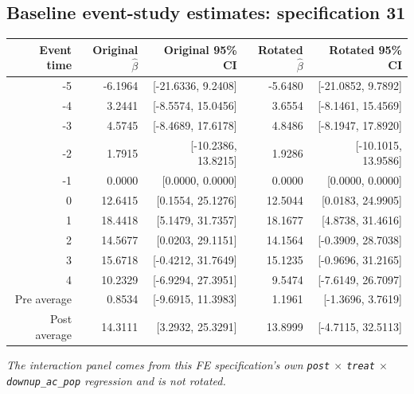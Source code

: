 \documentclass[10pt]{article}
\begin{document}
\subsection*{Baseline event-study estimates: specification 31}
\begin{center}
\scriptsize
\begin{tabular}{r rr rr}
\toprule
Event time & Original $\hat\beta$ & Original 95\% CI & Rotated $\hat\beta$ & Rotated 95\% CI \\
\midrule
-5 & -6.1964 & [-21.6336, 9.2408] & -5.6480 & [-21.0852, 9.7892] \\
-4 & 3.2441 & [-8.5574, 15.0456] & 3.6554 & [-8.1461, 15.4569] \\
-3 & 4.5745 & [-8.4689, 17.6178] & 4.8486 & [-8.1947, 17.8920] \\
-2 & 1.7915 & [-10.2386, 13.8215] & 1.9286 & [-10.1015, 13.9586] \\
-1 & 0.0000 & [0.0000, 0.0000] & 0.0000 & [0.0000, 0.0000] \\
0 & 12.6415 & [0.1554, 25.1276] & 12.5044 & [0.0183, 24.9905] \\
1 & 18.4418 & [5.1479, 31.7357] & 18.1677 & [4.8738, 31.4616] \\
2 & 14.5677 & [0.0203, 29.1151] & 14.1564 & [-0.3909, 28.7038] \\
3 & 15.6718 & [-0.4212, 31.7649] & 15.1235 & [-0.9696, 31.2165] \\
4 & 10.2329 & [-6.9294, 27.3951] & 9.5474 & [-7.6149, 26.7097] \\
\midrule
Pre average & 0.8534 & [-9.6915, 11.3983] & 1.1961 & [-1.3696, 3.7619] \\
Post average & 14.3111 & [3.2932, 25.3291] & 13.8999 & [-4.7115, 32.5113] \\
\bottomrule
\end{tabular}
\end{center}
\medskip
\textit{The interaction panel comes from this FE specification's own \texttt{post} $\times$ \texttt{treat} $\times$ \texttt{downup\_ac\_pop} regression and is not rotated.}
\clearpage
\end{document}
